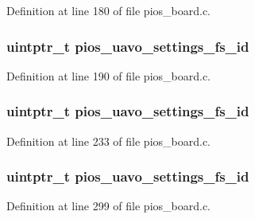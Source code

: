 Definition at line 180 of file pios\-\_\-board.\-c.

\hypertarget{group___open_pilot_core_gab060f441dd600b08386c0ca1b487217a}{
\subsubsection[{pios\-\_\-uavo\-\_\-settings\-\_\-fs\-\_\-id}]{\setlength{\rightskip}{0pt plus 5cm}uintptr\-\_\-t pios\-\_\-uavo\-\_\-settings\-\_\-fs\-\_\-id}}\label{group___open_pilot_core_gab060f441dd600b08386c0ca1b487217a}


Definition at line 190 of file pios\-\_\-board.\-c.

\hypertarget{group___open_pilot_core_gab060f441dd600b08386c0ca1b487217a}{
\subsubsection[{pios\-\_\-uavo\-\_\-settings\-\_\-fs\-\_\-id}]{\setlength{\rightskip}{0pt plus 5cm}uintptr\-\_\-t pios\-\_\-uavo\-\_\-settings\-\_\-fs\-\_\-id}}\label{group___open_pilot_core_gab060f441dd600b08386c0ca1b487217a}


Definition at line 233 of file pios\-\_\-board.\-c.

\hypertarget{group___open_pilot_core_gab060f441dd600b08386c0ca1b487217a}{
\subsubsection[{pios\-\_\-uavo\-\_\-settings\-\_\-fs\-\_\-id}]{\setlength{\rightskip}{0pt plus 5cm}uintptr\-\_\-t pios\-\_\-uavo\-\_\-settings\-\_\-fs\-\_\-id}}\label{group___open_pilot_core_gab060f441dd600b08386c0ca1b487217a}


Definition at line 299 of file pios\-\_\-board.\-c.

